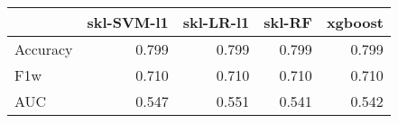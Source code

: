 \begin{tabular}{lrrrr}
\toprule
{} &  skl-SVM-l1 &  skl-LR-l1 &  skl-RF &  xgboost \\
\midrule
Accuracy &       0.799 &      0.799 &   0.799 &    0.799 \\
F1w      &       0.710 &      0.710 &   0.710 &    0.710 \\
AUC      &       0.547 &      0.551 &   0.541 &    0.542 \\
\bottomrule
\end{tabular}
